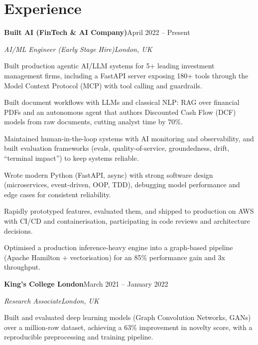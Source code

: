 \documentclass[10pt,a4paper]{article}
\newcommand{\entry}[4]{%
  {\color{company}\bfseries #1}\hfill {\color{muted}#2}\par
  \vspace{1pt}
  {\itshape #3}\hfill {\color{muted}\itshape #4}\par
  \vspace{3pt}%
}
\begin{document}
\section{Experience}
\entry{Built AI (FinTech \& AI Company)}{April 2022 -- Present}{AI/ML Engineer (Early Stage Hire)}{London, UK}
\begin{tight}
  \item Built production agentic AI/LLM systems for 5+ leading investment management firms, including a FastAPI server exposing 180+ tools through the Model Context Protocol (MCP) with tool calling and guardrails.
  \item Built document workflows with LLMs and classical NLP: RAG over financial PDFs and an autonomous agent that authors Discounted Cash Flow (DCF) models from raw documents, cutting analyst time by 70\%.
  \item Maintained human-in-the-loop systems with AI monitoring and observability, and built evaluation frameworks (evals, quality-of-service, groundedness, drift, ``terminal impact'') to keep systems reliable.
  \item Wrote modern Python (FastAPI, async) with strong software design (microservices, event-driven, OOP, TDD), debugging model performance and edge cases for consistent reliability.
  \item Rapidly prototyped features, evaluated them, and shipped to production on AWS with CI/CD and containerisation, participating in code reviews and architecture decisions.
  \item Optimised a production inference-heavy engine into a graph-based pipeline (Apache Hamilton + vectorisation) for an 85\% performance gain and 3x throughput.
\end{tight}

\entry{King's College London}{March 2021 -- January 2022}{Research Associate}{London, UK}
\begin{tight}
  \item Built and evaluated deep learning models (Graph Convolution Networks, GANs) over a million-row dataset, achieving a 63\% improvement in novelty score, with a reproducible preprocessing and training pipeline.
\end{tight}

\end{document}
